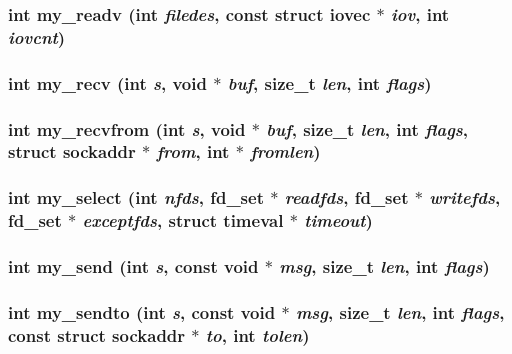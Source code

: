 \subsubsection{\setlength{\rightskip}{0pt plus 5cm}int my\_\-readv (int {\em filedes}, const struct iovec $\ast$ {\em iov}, int {\em iovcnt})}\label{mysock_8c_a12}


\subsubsection{\setlength{\rightskip}{0pt plus 5cm}int my\_\-recv (int {\em s}, void $\ast$ {\em buf}, size\_\-t {\em len}, int {\em flags})}\label{mysock_8c_a6}


\subsubsection{\setlength{\rightskip}{0pt plus 5cm}int my\_\-recvfrom (int {\em s}, void $\ast$ {\em buf}, size\_\-t {\em len}, int {\em flags}, struct sockaddr $\ast$ {\em from}, int $\ast$ {\em fromlen})}\label{mysock_8c_a9}


\subsubsection{\setlength{\rightskip}{0pt plus 5cm}int my\_\-select (int {\em nfds}, fd\_\-set $\ast$ {\em readfds}, fd\_\-set $\ast$ {\em writefds}, fd\_\-set $\ast$ {\em exceptfds}, struct timeval $\ast$ {\em timeout})}\label{mysock_8c_a11}


\subsubsection{\setlength{\rightskip}{0pt plus 5cm}int my\_\-send (int {\em s}, const void $\ast$ {\em msg}, size\_\-t {\em len}, int {\em flags})}\label{mysock_8c_a7}


\subsubsection{\setlength{\rightskip}{0pt plus 5cm}int my\_\-sendto (int {\em s}, const void $\ast$ {\em msg}, size\_\-t {\em len}, int {\em flags}, const struct sockaddr $\ast$ {\em to}, int {\em tolen})}\label{mysock_8c_a8}


